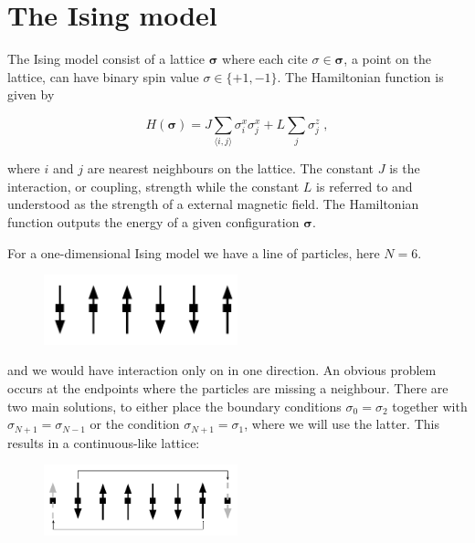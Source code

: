 \section{The Ising model}

The Ising model consist of a lattice $\boldsymbol{\sigma}$ where each cite $\sigma \in \boldsymbol{\sigma}$, a point on the lattice, can have binary spin value $\sigma \in \{+1, -1\}$. The Hamiltonian function is given by

\begin{equation}
  H(\boldsymbol{\sigma}) =J\sum_{\langle i,j\rangle} \sigma^x_i\sigma^x_j + L \sum_j \sigma^z_j \; ,
  \label{eq:Ising_hamiltonian}
\end{equation}

where $i$ and $j$ are nearest neighbours on the lattice. The constant $J$ is the interaction, or coupling, strength while the constant $L$ is referred to and understood as the strength of a external magnetic field. The Hamiltonian function outputs the energy of a given configuration $\boldsymbol{\sigma}$.

For a one-dimensional Ising model we have a line of particles, here $N = 6$.

\begin{figure}[H]
  \begin{center}
    \includegraphics[width=0.5\textwidth]{Figures/Drawn/Ising/ising 1d}
  \end{center}
\end{figure}

and we would have interaction only on in one direction. An obvious problem occurs at the endpoints where the particles are missing a neighbour. There are two main solutions, to either place the boundary conditions $\sigma_{0} = \sigma_{2}$ together with $\sigma_{N+1} = \sigma_{N-1}$ or the condition $\sigma_{N+1} = \sigma_{1}$, where we will use the latter. This results in a continuous-like lattice:

\begin{figure}[H]
  \begin{center}
    \includegraphics[width=0.5\textwidth]{Figures/Drawn/Ising/ising1dciclous}
  \end{center}
\end{figure}

